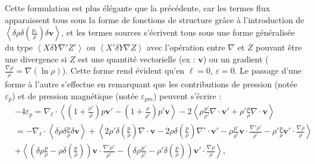 Cette formulation  est plus élégante que la précédente, car les termes flux apparaissent tous sous la forme de fonctions de structure grâce à l'introduction de $\left<\delta \rho \delta \left(\frac{p_*}{\rho}\right) \delta \boldsymbol{v}\right>$, et les termes sources s'écrivent tous sous une forme généralisée du type $\left<X \delta Y \nabla' Z'\right>$ ou  $\left<X' \delta Y \nabla Z\right>$ avec l'opération entre $\nabla$ et $Z$ pouvant être une divergence si $Z$ est une quantité vectorielle (ex : $\boldsymbol{v}$) ou un gradient ($\frac{\nabla \rho}{\rho} = \nabla \left(\ln \rho\right)$). Cette forme rend évident qu'en $\boldsymbol{\ell} = 0$, $\varepsilon = 0$. Le passage d'une forme à l'autre s'effectue en remarquant que les contributions de pression (notée $\varepsilon_{p}$) et de pression magnétique (notée $\varepsilon_{pm}$) peuvent s'écrire : 
\begin{equation}
\begin{align}
\label{eq:turb_ref_p} &-4\varepsilon_{p}=\nabla_{\boldsymbol{\ell}} \cdot \left<\left(1+\frac{\rho'}{\rho}\right) p \boldsymbol{v'} - \left(1+\frac{\rho}{\rho'}\right)p'\boldsymbol{v} \right>  -2\left<\rho  \frac{p'}{\rho'} \nabla \cdot \boldsymbol{v'} + \rho' \frac{p}{\rho} \nabla \cdot \boldsymbol{v}\right> \\
&= - \nabla_{\boldsymbol{\ell}} \cdot \left<\delta \rho  \delta \frac{p}{\rho} \delta \boldsymbol{v} \right>  +   \left<2  \rho' \delta \left(\frac{p}{\rho}\right) \nabla \cdot \boldsymbol{v} - 2  \rho \delta \left(\frac{p}{\rho}\right) \nabla' \cdot \boldsymbol{v'} -\rho \frac{p'}{\rho'} \boldsymbol{v} \cdot \frac{\nabla'\rho'}{\rho'} - \rho' \frac{p}{\rho} \boldsymbol{v'} \cdot \frac{\nabla\rho}{\rho} \right>\\ 
&+ \left<\left(\delta \rho \frac{p}{\rho} - \rho \delta \left(\frac{p}{\rho}\right)\right)\boldsymbol{v} \cdot \frac{\nabla' \rho'}{\rho'} - \left(\delta \rho \frac{p'}{\rho'} - \rho' \delta \left(\frac{p}{\rho}\right)\right)\boldsymbol{v'} \cdot \frac{\nabla \rho}{\rho}\right>,
    \end{align}
\end{equation}


